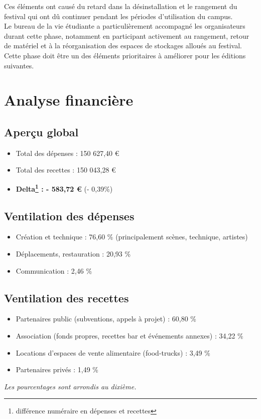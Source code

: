 \documentclass[12pt,a4paper]{report}
\begin{document}
Ces éléments ont causé du retard dans la désinstallation et le rangement du festival qui ont dû continuer pendant les périodes d’utilisation du campus.\\

Le bureau de la vie étudiante a particulièrement accompagné les organisateurs durant cette phase, notamment en participant activement au rangement, retour de matériel et à la réorganisation des espaces de stockages alloués au festival.\\

Cette phase doit être un des éléments prioritaires à améliorer pour les éditions suivantes.

\chapter{Analyse financière}

\section{Aperçu global}
\begin{itemize}
\item Total des dépenses : 150 627,40 €
\item Total des recettes : 150 043,28 €
\item \textbf{Delta\footnote{différence numéraire en dépenses et recettes} : - 583,72 €} (- 0,39\%)
\end{itemize}

\section{Ventilation des dépenses}
\begin{itemize}
\item Création et technique : 76,60 \% (principalement scènes, technique, artistes)
\item Déplacements, restauration : 20,93 \%
\item Communication : 2,46 \%
\end{itemize}

\section{Ventilation des recettes}
\begin{itemize}
\item Partenaires public (subventions, appels à projet) : 60,80 \%
\item Association (fonds propres, recettes bar et événements annexes) : 34,22 \%
\item Locations d'espaces de vente alimentaire (food-trucks) : 3,49 \%
\item Partenaires privés : 1,49 \%
\end{itemize}
\textit{Les pourcentages sont arrondis au dixième.}
\end{document}
